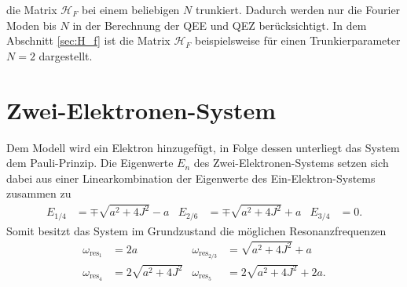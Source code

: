 die Matrix $\mathcal{H}_F$ bei
einem beliebigen $N$ trunkiert.
Dadurch werden nur die Fourier Moden bis $N$ in der
Berechnung der QEE und QEZ
berücksichtigt. In dem Abschnitt \ref{sec:H_f} ist die
Matrix $\mathcal{H}_F$  beispielsweise
für einen Trunkierparameter $N=2$ dargestellt.


\section{Zwei-Elektronen-System}
Dem Modell wird ein Elektron
hinzugefügt, in Folge dessen
unterliegt das System dem Pauli-Prinzip.
Die Eigenwerte $E_n$ des Zwei-Elektronen-Systems
setzen sich dabei aus einer
Linearkombination der Eigenwerte
des Ein-Elektron-Systems
zusammen \cite{phillip} zu
\begin{align}
E_{1/4}&=\mp\sqrt{a^2+4J^2}-a
&E_{2/6}&=\mp\sqrt{a^2+4J^2}+a
&E_{3/4}&=0.
\end{align}
Somit besitzt das System im Grundzustand die möglichen Resonanzfrequenzen
\begin{align}
\omega_{\text{res}_1}&=2a
&\omega_{\text{res}_{2/3}}&=\sqrt{a^2+4J^2}+a \\
\omega_{\text{res}_4}&=2\sqrt{a^2+4J^2}
&\omega_{\text{res}_5}&=2\sqrt{a^2+4J^2}+2a.
\end{align}
